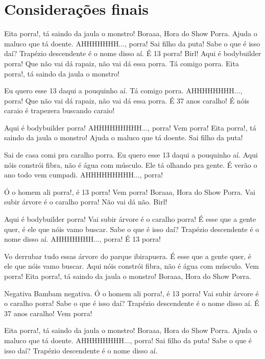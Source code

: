 \section{Considerações finais}
        
    Eita porra!, tá saindo da jaula o monstro! Boraaa, Hora do Show Porra. Ajuda o maluco que tá doente. AHHHHHHH..., porra! Sai filho da puta! Sabe o que é isso daí? Trapézio descendente é o nome disso aí. É 13 porra! Birl! Aqui é bodybuilder porra! Que não vai dá rapaiz, não vai dá essa porra. Tá comigo porra. Eita porra!, tá saindo da jaula o monstro!
    
    Eu quero esse 13 daqui a pouquinho aí. Tá comigo porra. AHHHHHHHH..., porra! Que não vai dá rapaiz, não vai dá essa porra. É 37 anos caralho! É nóis caraio é trapezera buscando caraio!
    
    Aqui é bodybuilder porra! AHHHHHHHHH..., porra! Vem porra! Eita porra!, tá saindo da jaula o monstro! Ajuda o maluco que tá doente. Sai filho da puta!
    
    Sai de casa comi pra caralho porra. Eu quero esse 13 daqui a pouquinho aí. Aqui nóis constrói fibra, não é água com músculo. Ele tá olhando pra gente. É verão o ano todo vem cumpadi. AHHHHHHHHH..., porra!
    
    Ó o homem ali porra!, é 13 porra! Vem porra! Boraaa, Hora do Show Porra. Vai subir árvore é o caralho porra! Não vai dá não. Birl!
    
    Aqui é bodybuilder porra! Vai subir árvore é o caralho porra! É esse que a gente quer, é ele que nóis vamo buscar. Sabe o que é isso daí? Trapézio descendente é o nome disso aí. AHHHHHHH..., porra! É 13 porra!
    
    Vo derrubar tudo essas árvore do parque ibirapuera. É esse que a gente quer, é ele que nóis vamo buscar. Aqui nóis constrói fibra, não é água com músculo. Vem porra! Eita porra!, tá saindo da jaula o monstro! Boraaa, Hora do Show Porra.
    
    Negativa Bambam negativa. Ó o homem ali porra!, é 13 porra! Vai subir árvore é o caralho porra! Sabe o que é isso daí? Trapézio descendente é o nome disso aí. É 37 anos caralho! Vem porra!
    
    Eita porra!, tá saindo da jaula o monstro! Boraaa, Hora do Show Porra. Ajuda o maluco que tá doente. AHHHHHHHH..., porra! Sai filho da puta! Sabe o que é isso daí? Trapézio descendente é o nome disso aí.